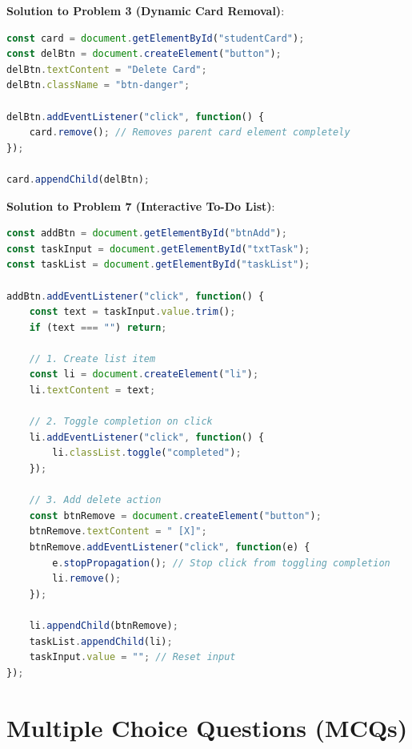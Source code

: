 \begin{solutionbox}
\noindent\textbf{Solution to Problem 3 (Dynamic Card Removal)}:
\begin{lstlisting}[language=JavaScript]
const card = document.getElementById("studentCard");
const delBtn = document.createElement("button");
delBtn.textContent = "Delete Card";
delBtn.className = "btn-danger";

delBtn.addEventListener("click", function() {
    card.remove(); // Removes parent card element completely
});

card.appendChild(delBtn);
\end{lstlisting}

\noindent\textbf{Solution to Problem 7 (Interactive To-Do List)}:
\begin{lstlisting}[language=JavaScript]
const addBtn = document.getElementById("btnAdd");
const taskInput = document.getElementById("txtTask");
const taskList = document.getElementById("taskList");

addBtn.addEventListener("click", function() {
    const text = taskInput.value.trim();
    if (text === "") return;

    // 1. Create list item
    const li = document.createElement("li");
    li.textContent = text;

    // 2. Toggle completion on click
    li.addEventListener("click", function() {
        li.classList.toggle("completed");
    });

    // 3. Add delete action
    const btnRemove = document.createElement("button");
    btnRemove.textContent = " [X]";
    btnRemove.addEventListener("click", function(e) {
        e.stopPropagation(); // Stop click from toggling completion
        li.remove();
    });

    li.appendChild(btnRemove);
    taskList.appendChild(li);
    taskInput.value = ""; // Reset input
});
\end{lstlisting}
\end{solutionbox}

\section{Multiple Choice Questions (MCQs)}

